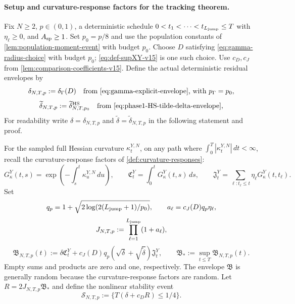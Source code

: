\paragraph{Setup and curvature-response factors for the tracking theorem.}
Fix $N\ge2$, $p\in(0,1)$, a deterministic schedule
$0<t_1<\cdots<t_{L_{\mathrm{jump}}}\le T$ with $\eta_\ell\ge0$, and $A_{\rm sp}\ge1$.
Set $p_0=p/8$ and use the population constants of
\cref{lem:population-moment-event} with budget $p_0$.
Choose $D$ satisfying \eqref{eq:gamma-radius-choice} with budget $p_0$;
\eqref{eq:def-supXY-v15} is one such choice. Use $c_D,c_J$ from
\cref{lem:comparison-coefficients-v15}.
Define the actual deterministic residual envelopes by
\begin{equation}
\label{eq:def-delta-v15}
\delta_{N,T,p}:=\delta_\Gamma(D)
\quad\text{from \eqref{eq:gamma-explicit-envelope}, with }p_\Gamma=p_0,
\end{equation}
\begin{equation}
\label{eq:def-tdelta-v15}
\widetilde\delta_{N,T,p}:=
\widetilde\delta_{N,T,p_0}^{\rm HS}
\quad\text{from \eqref{eq:phase1-HS-tilde-delta-envelope}},
\end{equation}
For readability write $\delta=\delta_{N,T,p}$ and
$\widetilde\delta=\widetilde\delta_{N,T,p}$ in the following statement and proof.

For the sampled full Hessian curvature $\kappa_t^{Y,N}$, on any path
where $\int_0^T|\kappa_t^{Y,N}|\,dt<\infty$, recall the curvature-response factors
of \cref{def:curvature-responses}:
\begin{equation}
\label{eq:tracking-curvature-responses}
G_\kappa^Y(t,s)=\exp\!\left(-\int_s^t\kappa_u^{Y,N}\,du\right),\qquad
\mathfrak C_t^Y=\int_0^tG_\kappa^Y(t,s)\,ds,\qquad
\mathfrak J_t^Y=\sum_{\ell:t_\ell\le t}\eta_\ell G_\kappa^Y(t,t_\ell).
\end{equation}
Set
\[
q_p=1+\sqrt{2\log(2(L_{\mathrm{jump}}+1)/p_0)},\qquad
a_\ell=c_J(D)q_p\eta_\ell,
\]
\begin{equation}
\label{eq:def-jump-amplification-v15}
J_{N,T,p}:=\prod_{\ell=1}^{L_{\mathrm{jump}}}(1+a_\ell),
\end{equation}
\begin{equation}
\label{eq:def-B-v15}
\mathfrak B_{N,T,p}(t):=
\delta\mathfrak C_t^Y+
c_J(D)q_p(\sqrt\delta+\sqrt{\widetilde\delta})\mathfrak J_t^Y,
\qquad \mathfrak B_*:=\sup_{t\le T}\mathfrak B_{N,T,p}(t).
\end{equation}
Empty sums and products are zero and one, respectively. The envelope
$\mathfrak B$ is generally random because the curvature-response factors are random.
Let $R=2J_{N,T,p}\mathfrak B_*$ and define the nonlinear stability event
\begin{equation}
\label{eq:smallness-v15}
\mathcal S_{N,T,p}:=
\{T(\delta+c_D R)\le1/4\}.
\end{equation}
